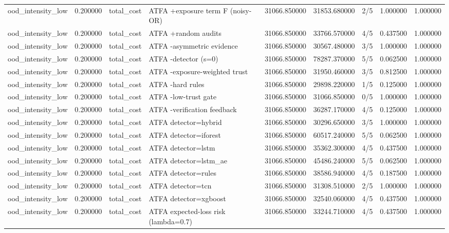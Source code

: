 \begin{tabular}{lrllrrlrr}
ood\_intensity\_low & 0.200000 & total\_cost & ATFA +exposure term F (noisy-OR) & 31066.850000 & 31853.680000 & 2/5 & 1.000000 & 1.000000 \\
ood\_intensity\_low & 0.200000 & total\_cost & ATFA +random audits & 31066.850000 & 33766.570000 & 4/5 & 0.437500 & 1.000000 \\
ood\_intensity\_low & 0.200000 & total\_cost & ATFA -asymmetric evidence & 31066.850000 & 30567.480000 & 3/5 & 1.000000 & 1.000000 \\
ood\_intensity\_low & 0.200000 & total\_cost & ATFA -detector (s=0) & 31066.850000 & 78287.370000 & 5/5 & 0.062500 & 1.000000 \\
ood\_intensity\_low & 0.200000 & total\_cost & ATFA -exposure-weighted trust & 31066.850000 & 31950.460000 & 3/5 & 0.812500 & 1.000000 \\
ood\_intensity\_low & 0.200000 & total\_cost & ATFA -hard rules & 31066.850000 & 29898.220000 & 1/5 & 0.125000 & 1.000000 \\
ood\_intensity\_low & 0.200000 & total\_cost & ATFA -low-trust gate & 31066.850000 & 31066.850000 & 0/5 & 1.000000 & 1.000000 \\
ood\_intensity\_low & 0.200000 & total\_cost & ATFA -verification feedback & 31066.850000 & 36287.170000 & 4/5 & 0.125000 & 1.000000 \\
ood\_intensity\_low & 0.200000 & total\_cost & ATFA detector=hybrid & 31066.850000 & 30296.650000 & 3/5 & 1.000000 & 1.000000 \\
ood\_intensity\_low & 0.200000 & total\_cost & ATFA detector=iforest & 31066.850000 & 60517.240000 & 5/5 & 0.062500 & 1.000000 \\
ood\_intensity\_low & 0.200000 & total\_cost & ATFA detector=lstm & 31066.850000 & 35362.300000 & 4/5 & 0.437500 & 1.000000 \\
ood\_intensity\_low & 0.200000 & total\_cost & ATFA detector=lstm\_ae & 31066.850000 & 45486.240000 & 5/5 & 0.062500 & 1.000000 \\
ood\_intensity\_low & 0.200000 & total\_cost & ATFA detector=rules & 31066.850000 & 38586.940000 & 4/5 & 0.187500 & 1.000000 \\
ood\_intensity\_low & 0.200000 & total\_cost & ATFA detector=tcn & 31066.850000 & 31308.510000 & 2/5 & 1.000000 & 1.000000 \\
ood\_intensity\_low & 0.200000 & total\_cost & ATFA detector=xgboost & 31066.850000 & 32540.060000 & 4/5 & 0.437500 & 1.000000 \\
ood\_intensity\_low & 0.200000 & total\_cost & ATFA expected-loss risk (lambda=0.7) & 31066.850000 & 33244.710000 & 4/5 & 0.437500 & 1.000000 \\

\end{tabular}
